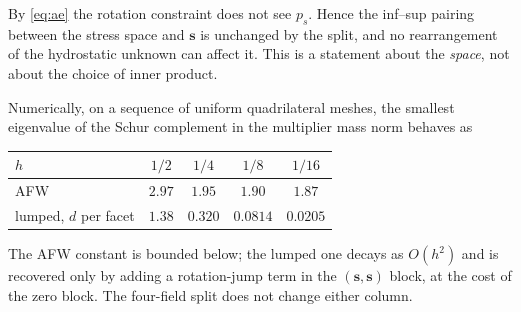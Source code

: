 \documentclass[11pt,a4paper]{article}
\theoremstyle{plain}
\theoremstyle{remark}
\begin{document}
By \eqref{eq:ae} the rotation constraint does not see $p_s$. Hence the
inf--sup pairing between the stress space and $\boldsymbol{s}$ is unchanged by
the split, and no rearrangement of the hydrostatic unknown can affect it. This
is a statement about the \emph{space}, not about the choice of inner product.

Numerically, on a sequence of uniform quadrilateral meshes, the smallest
eigenvalue of the Schur complement in the multiplier mass norm behaves as
\begin{center}
\begin{tabular}{lcccc}
\toprule
$h$ & $1/2$ & $1/4$ & $1/8$ & $1/16$ \\
\midrule
AFW                    & $2.97$ & $1.95$ & $1.90$ & $1.87$ \\
lumped, $d$ per facet  & $1.38$ & $0.320$ & $0.0814$ & $0.0205$ \\
\bottomrule
\end{tabular}
\end{center}
The AFW constant is bounded below; the lumped one decays as $O(h^{2})$ and is
recovered only by adding a rotation-jump term in the $(\boldsymbol{s},
\boldsymbol{s})$ block, at the cost of the zero block. The four-field split
does not change either column.
\end{document}
